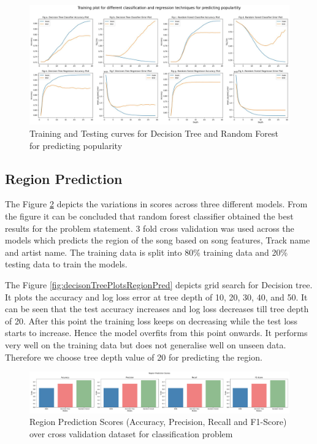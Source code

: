 \documentclass{article}
\begin{document}
\begin{figure}[!ht]
    \centering
    \includegraphics[scale = 0.25]{Figures/Popularity_accuracy_loss_plot.jpeg}
    \caption{Training and Testing curves for Decision Tree and Random Forest for predicting popularity}
    \label{fig:accuracylossplot}
\end{figure} 

\subsection{Region Prediction}

The Figure \ref{fig:regionPredClassReport} depicts the variations in scores across three different models. From the figure it can be concluded that random forest classifier obtained the best results for the problem statement. 3 fold cross validation was used across the models which predicts the region of the song based on song features, Track name and artist name. The training data is split into 80\% training data and 20\% testing data to train the models.

The Figure \ref{fig:decisonTreePlotsRegionPred} depicts grid search for Decision tree. It plots the accuracy and log loss error at tree depth of 10, 20, 30, 40, and 50. It can be seen that the test accuracy increases and log loss decreases till tree depth of 20. After this point the training loss keeps on decreasing while the test loss starts to increase. Hence the model overfits from this point onwards. It performs very well on the training data but does not generalise well on unseen data.
Therefore we choose tree depth value of 20 for predicting the region.

\begin{figure}[!ht]
    \centering
    \includegraphics[scale = 0.24]{Figures/Region Predictions (1).pdf}
    \caption{Region Prediction Scores (Accuracy, Precision, Recall and F1-Score) over cross validation dataset for classification problem}
    \label{fig:regionPredClassReport}
\end{figure} 
\end{document}
